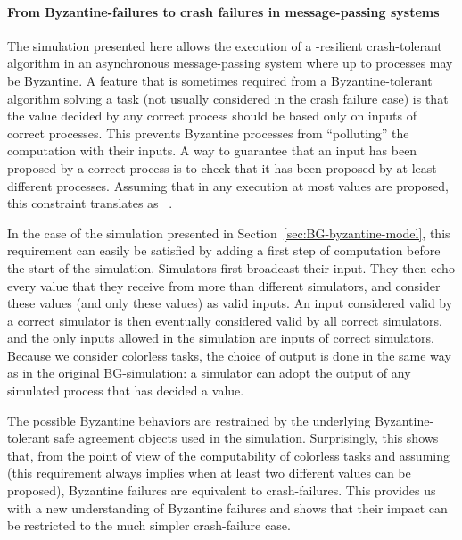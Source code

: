 \documentclass[11pt,letterpaper]{article}
\begin{document}
\paragraph{From Byzantine-failures to crash 
failures in message-passing systems}
The simulation presented here allows the execution of a 
-resilient crash-tolerant algorithm in an asynchronous
message-passing system where up to  processes may be Byzantine.
A  feature that is sometimes required from a Byzantine-tolerant algorithm
solving a task (not usually  considered in the crash failure case)
is that the value decided by any correct process should be based only
on  inputs of  correct processes. This prevents Byzantine processes
from ``polluting'' the computation with their inputs.
 A way to guarantee that an input has
been proposed by a correct process is to check that it has been
proposed by at least  different processes. Assuming that
in any execution at most  values are proposed,  this constraint
translates as ~\cite{HKR14,MTH14}. 


In the case of the simulation presented in
Section~\ref{sec:BG-byzantine-model}, this requirement can easily be
satisfied by adding a first step of computation before the start of
the simulation. Simulators first broadcast their input. They then echo
every value that they receive from more than  different
simulators, and consider these values (and only these values) as valid
inputs. An input considered valid by a correct simulator is then
eventually considered valid by all correct simulators, and the only
inputs allowed in the simulation are inputs of correct simulators.
Because we consider colorless tasks, the choice of output is done in the 
same way as in the original BG-simulation: a simulator can adopt the 
output of any simulated process that has decided a value.

The possible Byzantine behaviors are restrained by the underlying
Byzantine-tolerant safe agreement objects used in the simulation.
Surprisingly, this shows that, from the point of view of the
computability of colorless tasks and assuming  (this
requirement always implies  when at least two different values
can be proposed), Byzantine failures are equivalent to crash-failures.
This provides us with a new understanding of Byzantine failures and
shows that their impact can be restricted to the much simpler
crash-failure case.
\end{document}
